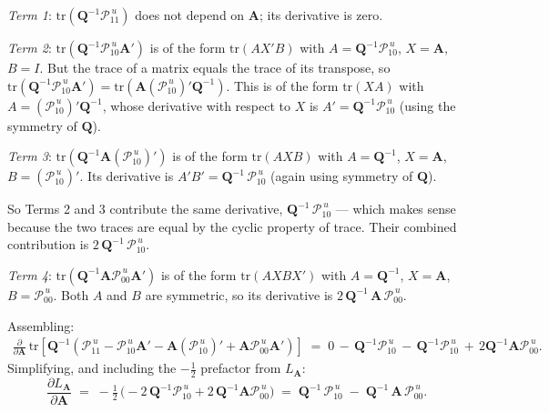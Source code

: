 \documentclass[11pt, a4paper, oneside]{article}
\newcommand{\mA}{\mathbf{A}}
\newcommand{\mQ}{\mathbf{Q}}
\begin{document}
\emph{Term 1}: $\mathrm{tr}(\mQ^{-1} \mathcal{P}_{11}^{\,u})$ does not
depend on $\mA$; its derivative is zero.

\emph{Term 2}: $\mathrm{tr}(\mQ^{-1} \mathcal{P}_{10}^{\,u} \mA')$ is
of the form $\mathrm{tr}(A X' B)$ with $A = \mQ^{-1} \mathcal{P}_{10}^{\,u}$,
$X = \mA$, $B = I$. But the trace of a matrix equals the trace of its
transpose, so
$\mathrm{tr}(\mQ^{-1} \mathcal{P}_{10}^{\,u} \mA') = \mathrm{tr}(\mA (\mathcal{P}_{10}^{\,u})' \mQ^{-1})$.
This is of the form $\mathrm{tr}(X A)$ with $A = (\mathcal{P}_{10}^{\,u})' \mQ^{-1}$, whose derivative with respect to $X$ is $A' = \mQ^{-1} \mathcal{P}_{10}^{\,u}$ (using the symmetry of $\mQ$).

\emph{Term 3}: $\mathrm{tr}(\mQ^{-1} \mA (\mathcal{P}_{10}^{\,u})')$ is
of the form $\mathrm{tr}(A X B)$ with $A = \mQ^{-1}$, $X = \mA$,
$B = (\mathcal{P}_{10}^{\,u})'$. Its derivative is
$A' B' = \mQ^{-1}\, \mathcal{P}_{10}^{\,u}$ (again using symmetry of $\mQ$).

So Terms 2 and 3 contribute the same derivative,
$\mQ^{-1}\, \mathcal{P}_{10}^{\,u}$ — which makes sense because the
two traces are equal by the cyclic property of trace. Their combined
contribution is $2\, \mQ^{-1}\, \mathcal{P}_{10}^{\,u}$.

\emph{Term 4}: $\mathrm{tr}(\mQ^{-1} \mA \mathcal{P}_{00}^{\,u} \mA')$
is of the form $\mathrm{tr}(A X B X')$ with $A = \mQ^{-1}$, $X = \mA$,
$B = \mathcal{P}_{00}^{\,u}$. Both $A$ and $B$ are symmetric, so its
derivative is $2\, \mQ^{-1}\, \mA\, \mathcal{P}_{00}^{\,u}$.

Assembling:
\begin{align*}
\frac{\partial}{\partial \mA}\,\mathrm{tr}\!\left[\mQ^{-1}\!\left(
\mathcal{P}_{11}^{\,u} - \mathcal{P}_{10}^{\,u}\mA' - \mA(\mathcal{P}_{10}^{\,u})'  + \mA \mathcal{P}_{00}^{\,u} \mA'\right)\right]
\;=\;
0 \,-\, \mQ^{-1}\mathcal{P}_{10}^{\,u} \,-\, \mQ^{-1}\mathcal{P}_{10}^{\,u} \,+\, 2\mQ^{-1}\mA\mathcal{P}_{00}^{\,u}.
\end{align*}
Simplifying, and including the $-\tfrac{1}{2}$ prefactor from
$L_{\mA}$:
\begin{equation}
\frac{\partial L_{\mA}}{\partial \mA}
\;=\;
-\tfrac{1}{2}\,\big(-2\,\mQ^{-1}\mathcal{P}_{10}^{\,u} + 2\,\mQ^{-1}\mA\mathcal{P}_{00}^{\,u}\big)
\;=\; \mQ^{-1}\,\mathcal{P}_{10}^{\,u} \;-\; \mQ^{-1}\,\mA\,\mathcal{P}_{00}^{\,u}.
\label{eq:grad-A}
\end{equation}
\end{document}
